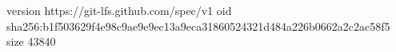version https://git-lfs.github.com/spec/v1
oid sha256:b1f503629f4e98c9ae9e9ec13a9eca31860524321d484a226b0662a2c2ac58f5
size 43840
